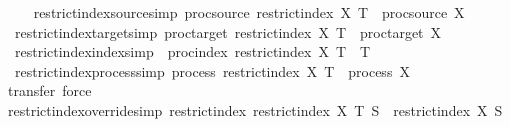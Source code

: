 \begin{isabellebody}
\isamarkupfalse%
\isanewline
\ \ \isanewline
\ \ restrict{\isacharunderscore}{\kern0pt}index{\isacharunderscore}{\kern0pt}source{\isacharbrackleft}{\kern0pt}simp{\isacharbrackright}{\kern0pt}{\isacharcolon}{\kern0pt}\ {\isachardoublequoteopen}proc{\isacharunderscore}{\kern0pt}source\ {\isacharparenleft}{\kern0pt}restrict{\isacharunderscore}{\kern0pt}index\ X\ T{\isacharparenright}{\kern0pt}\ {\isacharequal}{\kern0pt}\ proc{\isacharunderscore}{\kern0pt}source\ X{\isachardoublequoteclose}\ \isanewline
\ \ restrict{\isacharunderscore}{\kern0pt}index{\isacharunderscore}{\kern0pt}target{\isacharbrackleft}{\kern0pt}simp{\isacharbrackright}{\kern0pt}{\isacharcolon}{\kern0pt}\ {\isachardoublequoteopen}proc{\isacharunderscore}{\kern0pt}target\ {\isacharparenleft}{\kern0pt}restrict{\isacharunderscore}{\kern0pt}index\ X\ T{\isacharparenright}{\kern0pt}\ {\isacharequal}{\kern0pt}\ proc{\isacharunderscore}{\kern0pt}target\ X{\isachardoublequoteclose}\ \isanewline
\ \ restrict{\isacharunderscore}{\kern0pt}index{\isacharunderscore}{\kern0pt}index{\isacharbrackleft}{\kern0pt}simp{\isacharbrackright}{\kern0pt}{\isacharcolon}{\kern0pt}\ \ {\isachardoublequoteopen}proc{\isacharunderscore}{\kern0pt}index\ {\isacharparenleft}{\kern0pt}restrict{\isacharunderscore}{\kern0pt}index\ X\ T{\isacharparenright}{\kern0pt}\ {\isacharequal}{\kern0pt}\ T{\isachardoublequoteclose}\ \isanewline
\ \ restrict{\isacharunderscore}{\kern0pt}index{\isacharunderscore}{\kern0pt}process{\isacharbrackleft}{\kern0pt}simp{\isacharbrackright}{\kern0pt}{\isacharcolon}{\kern0pt}\ {\isachardoublequoteopen}process\ {\isacharparenleft}{\kern0pt}restrict{\isacharunderscore}{\kern0pt}index\ X\ T{\isacharparenright}{\kern0pt}\ {\isacharequal}{\kern0pt}\ process\ X{\isachardoublequoteclose}\isanewline
%
\isadelimproof
\ \ %
\endisadelimproof
%
\isatagproof
{}\isamarkupfalse%
\ {\isacharparenleft}{\kern0pt}transfer{\isacharcomma}{\kern0pt}\ force{\isacharparenright}{\kern0pt}{\isacharplus}{\kern0pt}%
\endisatagproof
{\isafoldproof}%
%
\isadelimproof
\isanewline
%
\endisadelimproof
\isanewline
{}\isamarkupfalse%
\ restrict{\isacharunderscore}{\kern0pt}index{\isacharunderscore}{\kern0pt}override{\isacharbrackleft}{\kern0pt}simp{\isacharbrackright}{\kern0pt}{\isacharcolon}{\kern0pt}\ {\isachardoublequoteopen}restrict{\isacharunderscore}{\kern0pt}index\ {\isacharparenleft}{\kern0pt}restrict{\isacharunderscore}{\kern0pt}index\ X\ T{\isacharparenright}{\kern0pt}\ S\ {\isacharequal}{\kern0pt}\ restrict{\isacharunderscore}{\kern0pt}index\ X\ S{\isachardoublequoteclose}\isanewline

\end{isabellebody}
